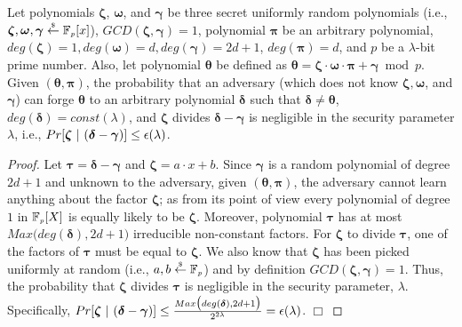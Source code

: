 \begin{theorem}\label{proof::unforgeable-poly}
%
Let polynomials $\bm\zeta$, $\bm\omega$, and $\bm\gamma$ be three secret uniformly random polynomials (i.e., $\bm\zeta,\bm\omega, \bm\gamma\stackrel{\scriptscriptstyle\$}\leftarrow \mathbb F_{\scriptscriptstyle p}[x]$),   $GCD(\bm\zeta, \bm\gamma)=1$, polynomial $\bm\pi$ be an arbitrary polynomial,   $deg(\bm\zeta)= 1, deg(\bm\omega)=d,  deg(\bm\gamma)= 2d+1$,  $deg(\bm\pi)=d$, and $p$ be a $\lambda$-bit prime number. Also, let polynomial $\bm\theta$ be defined as  $\bm\theta=\bm\zeta\cdot \bm\omega\cdot\bm \pi+\bm \gamma \bmod p$. Given $(\bm\theta,\bm\pi)$, the probability that an adversary (which does not know $\bm\zeta, \bm\omega$, and $\bm\gamma$) can forge $\bm\theta$ to an arbitrary polynomial $\bm\delta$ such that  $\bm\delta\neq \bm\theta$, $deg(\bm\delta)= const(\lambda)$, and $\bm\zeta$ divides $\bm\delta-\bm\gamma$ is negligible in the security parameter $\lambda$, i.e., 
%
$Pr[ \bm\zeta \ | \ (\bm\delta-\bm\gamma) ]\leq \negl(\lambda)$.
%
\end{theorem}


\begin{proof}

Let $\bm\tau=\bm\delta-\bm\gamma$ and $\bm\zeta=a\cdot x+b$. Since $\bm\gamma$ is a random polynomial of degree $2d+1$ and unknown to the adversary, given $(\bm\theta, \bm\pi)$,  the adversary cannot learn anything about the factor $\bm\zeta$; as from its point of view every polynomial of degree $1$ in $\mathbb{F}_{\scriptscriptstyle p}[X]$ is equally likely to be $\bm\zeta$. Moreover,  polynomial $\bm\tau$ has at most $Max\big(deg(\bm\delta), 2d+1\big)$ irreducible non-constant factors.  For $\bm\zeta $ to divide $\bm\tau$,  one of the factors of $\bm\tau$ must be equal to $\bm\zeta$. We  also know that $\bm\zeta$ has been picked uniformly at random (i.e., $a,b
\stackrel{\scriptscriptstyle \$}\leftarrow \mathbb F_{\scriptscriptstyle p}$) and by definition $GCD(\bm\zeta, \bm\gamma)=1$. Thus, the probability that $\bm\zeta $ divides $\bm\tau$ is negligible in the security parameter, $\lambda$. Specifically, $Pr[ \bm\zeta \ | \ (\bm\delta-\bm\gamma)]\leq \frac{Max\big(deg(\bm\delta), 2d+1\big)} {2^{\st 2\lambda}}=\negl(\lambda)$. 
\hfill\(\Box\)\end{proof} 

